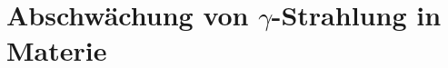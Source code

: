 \documentclass[../protokoll.tex]{subfiles}
\begin{document}
\section{Abschwächung von $\gamma$-Strahlung in Materie}
\end{document}
